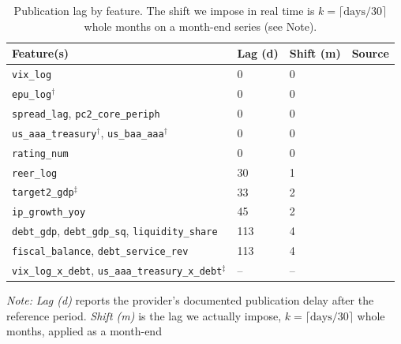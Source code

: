 \begin{table}[H]
\centering
\caption{Publication lag by feature. The shift we impose in real time is
$k=\lceil \text{days}/30\rceil$ whole months on a month-end series
(see Note).}
\label{tab:publication-lags}
\begin{tabular}{@{}p{4.3cm}p{1.2cm}p{1.4cm}p{5.3cm}@{}}
\toprule
\textbf{Feature(s)} & \textbf{Lag (d)} & \textbf{Shift (m)} & \textbf{Source} \\
\midrule
\texttt{vix\_log}                                   & 0    & 0  & \parencite{fred_vixcls} \\
\texttt{epu\_log}$^{\dagger}$                        & 0    & 0  & \parencite[p.\,6, fn.\,8]{baker2016epu} \\
\texttt{spread\_lag}, \texttt{pc2\_core\_periph}     & 0    & 0  & \parencite{ecb_irs_calendar} \\
\texttt{us\_aaa\_treasury}$^{\dagger}$, \texttt{us\_baa\_aaa}$^{\dagger}$
                                                     & 0    & 0  & \parencite{fed_h15_qa} \\
\texttt{rating\_num}                                 & 0    & 0  & \parencite{spglobal_emea_calendar,afonsofurcerigomes2012} \\
\texttt{reer\_log}                                   & 30   & 1  & \parencite{eurostat_erteff} \\
\texttt{target2\_gdp}$^{\ddagger}$                    & 33   & 2  & \parencite{ecb_target_balances} \\
\texttt{ip\_growth\_yoy}                             & 45   & 2  & \parencite{eurostat_ip_releases} \\
\texttt{debt\_gdp}, \texttt{debt\_gdp\_sq},
\texttt{liquidity\_share}                            & 113  & 4  & \parencite{eurostat_gov10qggdebt} \\
\texttt{fiscal\_balance}, \texttt{debt\_service\_rev}& 113  & 4  & \parencite{eurostat_gov10qggnfa} \\
\texttt{vix\_log\_x\_debt},
\texttt{us\_aaa\_treasury\_x\_debt}$^{\ddagger}$      & --   & -- & \parencite{eurostat_gov10qggdebt} \\
\bottomrule
\end{tabular}
\vspace{4pt}
\raggedright\footnotesize
\textit{Note:} \emph{Lag (d)} reports the provider's documented publication
delay after the reference period. \emph{Shift (m)} is the lag we actually
impose, $k=\lceil \text{days}/30\rceil$ whole months, applied as a month-end

\end{table}

